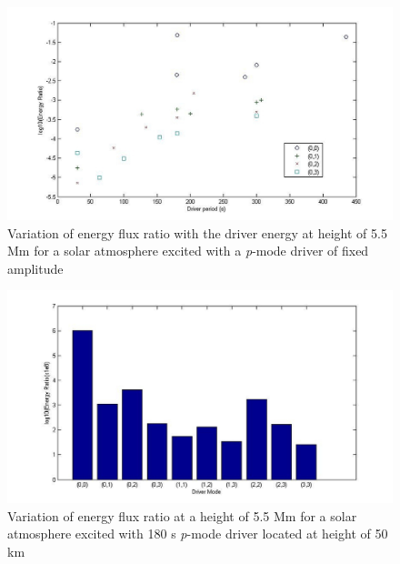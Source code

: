 \documentclass[preprint,authoryear,12pt]{elsarticle}
\begin{document}
\begin{figure}[t]
\includegraphics[scale=2]{imrescale/ratio_varoverdrve_eflux_vperiod_for_modes_5p5Mm.jpg}
\caption{Variation of energy flux ratio with the driver energy at height of 5.5 Mm for a solar atmosphere excited with a {\it p}-mode driver of fixed amplitude}
\label{Fig17}
\end{figure}


\begin{figure}[t]
\includegraphics[scale=2]{imrescale/ratio_varoverdrve_eflux_vperiod_forallmodes_180s_5p5Mm.jpg}
\caption{Variation of energy flux ratio at a height of 5.5 Mm for a solar atmosphere excited with 180 s {\it p}-mode driver located 
at height of 50 km}
\label{Fig18}
\end{figure}
\end{document}
